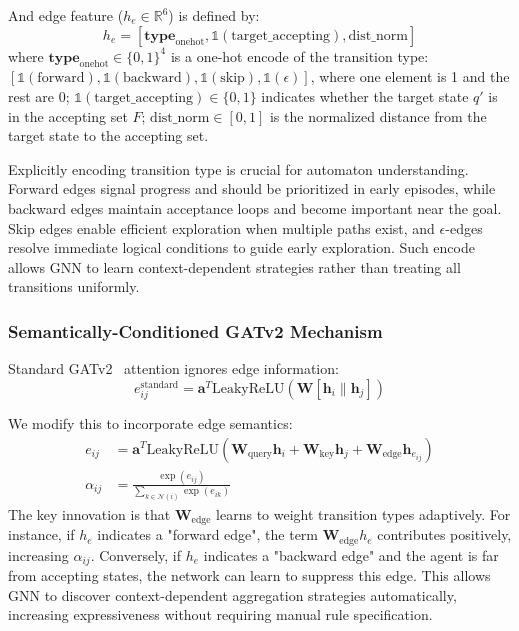 \documentclass{article}
\begin{document}
And edge feature ($h_e \in \mathbb{R}^6$) is defined by:
\begin{equation}
\label{eq:edge_features}
h_e = [\mathbf{type}_{\text{onehot}}, \mathbb{1}(\text{target\_accepting}), \text{dist\_norm}]
\end{equation}
where $\mathbf{type}_{\text{onehot}} \in \{0,1\}^4$ is a one-hot encode of the transition type: $[\mathbb{1}(\text{forward}), \mathbb{1}(\text{backward}), \mathbb{1}(\text{skip}), \mathbb{1}(\epsilon)]$, where one element is 1 and the rest are 0; $\mathbb{1}(\text{target\_accepting}) \in \{0,1\}$ indicates whether the target state $q'$ is in the accepting set $F$; $\text{dist\_norm} \in [0,1]$ is the normalized distance from the target state to the accepting set.

Explicitly encoding transition type is crucial for automaton understanding. Forward edges signal progress and should be prioritized in early episodes, while backward edges maintain acceptance loops and become important near the goal. Skip edges enable efficient exploration when multiple paths exist, and $\epsilon$-edges resolve immediate logical conditions to guide early exploration. Such encode allows GNN to learn context-dependent strategies rather than treating all transitions uniformly.



\subsubsection{Semantically-Conditioned GATv2 Mechanism}

Standard GATv2~\citep{Brody2022} attention ignores edge information:
\begin{equation}
\label{eq:gat_standard}
e_{ij}^{\text{standard}} = \mathbf{a}^T \text{LeakyReLU}(\mathbf{W} [\mathbf{h}_i \| \mathbf{h}_j])
\end{equation}

We modify this to incorporate edge semantics:
\begin{align}
\label{eq:gat_semantic}
e_{ij} &= \mathbf{a}^T \text{LeakyReLU}\left( \mathbf{W}_{\text{query}} \mathbf{h}_i + \mathbf{W}_{\text{key}} \mathbf{h}_j + \mathbf{W}_{\text{edge}} \mathbf{h}_{e_{ij}} \right) \\
\alpha_{ij} &= \frac{\exp(e_{ij})}{\sum_{k \in \mathcal{N}(i)} \exp(e_{ik})}
\end{align}
The key innovation is that $\mathbf{W}_{\text{edge}}$ learns to weight transition types adaptively. For instance, if $h_e$ indicates a "forward edge", the term $\mathbf{W}_{\text{edge}} h_e$ contributes positively, increasing $\alpha_{ij}$. Conversely, if $h_e$ indicates a "backward edge" and the agent is far from accepting states, the network can learn to suppress this edge. This allows GNN to discover context-dependent aggregation strategies automatically, increasing expressiveness without requiring manual rule specification.
\end{document}
